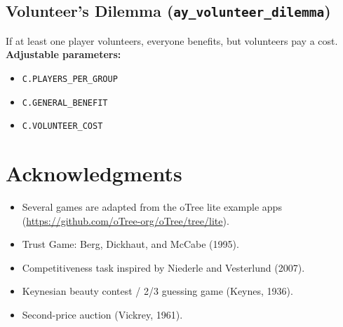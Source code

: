 \documentclass[11pt]{article}
\begin{document}
\subsection*{Volunteer's Dilemma (\texttt{ay\_volunteer\_dilemma})}
If at least one player volunteers, everyone benefits, but volunteers pay a cost.
\textbf{Adjustable parameters:}
\begin{itemize}
\item \texttt{C.PLAYERS\_PER\_GROUP}
\item \texttt{C.GENERAL\_BENEFIT}
\item \texttt{C.VOLUNTEER\_COST}
\end{itemize}

\section*{Acknowledgments}
\begin{itemize}
\item Several games are adapted from the oTree lite example apps
      (\url{https://github.com/oTree-org/oTree/tree/lite}).
\item Trust Game: Berg, Dickhaut, and McCabe (1995).
\item Competitiveness task inspired by Niederle and Vesterlund (2007).
\item Keynesian beauty contest / 2/3 guessing game (Keynes, 1936).
\item Second-price auction (Vickrey, 1961).
\end{itemize}
\end{document}
